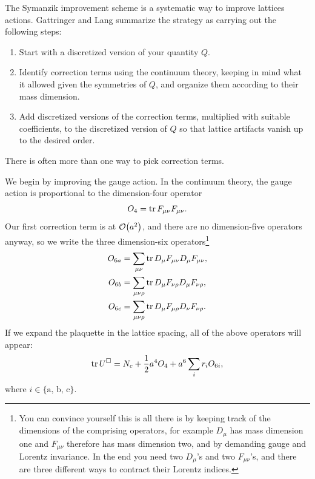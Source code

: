 The Symanzik improvement scheme \cite{symanzik_continuum_1983,
symanzik_continuum_1983-1,curci_symanziks_1983,luscher_shell_1985} 
is a systematic way to
improve lattices actions. Gattringer and Lang summarize the strategy as
carrying out the following steps:
\begin{enumerate}
  \item Start with a discretized version of your quantity $Q$.
  \item Identify correction terms using the continuum theory, keeping in mind
        what it allowed given the symmetries of $Q$, and organize them according
        to their mass dimension.
  \item Add discretized versions of the correction terms, multiplied with
        suitable coefficients, to the discretized version of $Q$ so that 
        lattice artifacts vanish up to the desired order.
\end{enumerate}
There is often more than one way to pick correction terms.

We begin by improving the gauge action. In the continuum theory, the gauge
action is proportional to the dimension-four operator
\begin{equation}
  O_4 = \tr F_{\mu\nu}F_{\mu\nu}.
\end{equation}
Our first correction term is at $\order{a^2}$, and there are no dimension-five
operators anyway, so we write the three dimension-six operators\footnote{You 
can convince yourself this is all there is by keeping track of the
dimensions of the comprising operators, for example $D_\mu$ has mass dimension
one and $F_{\mu\nu}$ therefore has mass dimension two, and by demanding gauge
and Lorentz invariance. In the end you need two $D_\mu$'s and two 
$F_{\mu\nu}$'s, and there are three different ways to contract their 
Lorentz indices.}
\begin{equation}\begin{aligned}
  O_{6a}&=\sum_{\mu\nu}\tr D_\mu F_{\mu\nu} D_\mu F_{\mu\nu},\\
  O_{6b}&=\sum_{\mu\nu\rho}\tr D_\mu F_{\nu\rho} D_\mu F_{\nu\rho},\\
  O_{6c}&=\sum_{\mu\nu\rho}\tr D_\mu F_{\mu\rho} D_\nu F_{\nu\rho}.
\end{aligned}\end{equation}
If we expand the plaquette in the lattice spacing, all of the above
operators will appear:
\begin{equation}
  \tr U^\square = N_c + \frac{1}{2}a^4O_4+a^6\sum_i r_iO_{6i},
\end{equation}
where $i\in\{\text{a, b, c}\}$.

